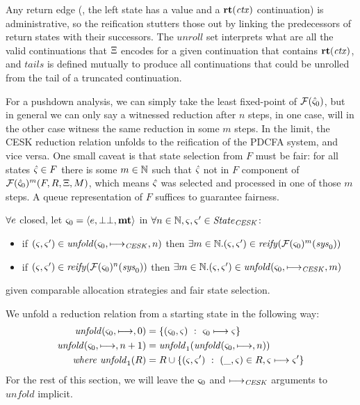 Any return edge (\ie, the left state has a value and a $\mathbf{rt}(\mathit{ctx})$ continuation) is administrative, so the reification stutters those out by linking the predecessors of return states with their successors.
%
The $\mathit{unroll}$ set interprets what are all the valid continuations that $\Xi$ encodes for a given continuation that contains $\mathbf{rt}(\mathit{ctx})$, and $\mathit{tails}$ is defined mutually to produce all continuations that could be unrolled from the tail of a truncated continuation.

For a pushdown analysis, we can simply take the least fixed-point of ${\mathcal F}(\hat\varsigma_0)$, but in general we can only say a witnessed reduction after $n$ steps, in one case, will in the other case witness the same reduction in some $m$ steps.
%
In the limit, the CESK reduction relation unfolds to the reification of the PDCFA system, and vice versa.
%
One small caveat is that state selection from $F$ must be fair: for all states $\hat\varsigma \in F$ there is some $m \in {\mathbb N}$ such that $\hat\varsigma$ not in $F$ component of ${\mathcal F}(\hat\varsigma_0)^m(F,R,\Xi,M)$, which means $\hat\varsigma$ was selected and processed in one of those $m$ steps.
%
A queue representation of $F$ suffices to guarantee fairness.

\begin{theorem}\label{thm:concrete-tabular}
  $\forall e$ closed, let $\varsigma_0 = \langle e,\bot\bot,\mathbf{mt} \rangle$ in
  $\forall n \in {\mathbb N},\varsigma,\varsigma' \in \mathit{State}_\mathit{CESK}$:
  \begin{itemize}
  \item{if $(\varsigma,\varsigma') \in \mathit{unfold}(\varsigma_0,\longmapsto_\mathit{CESK},n)$ then
      $\exists m \in {\mathbb N}. (\varsigma,\varsigma') \in \mathit{reify}({\mathcal F}(\varsigma_0)^m(\mathit{sys}_0))$}
  \item{
      if $(\varsigma,\varsigma') \in \mathit{reify}({\mathcal F}(\varsigma_0)^n(\mathit{sys}_0))$ then
      $\exists m \in {\mathbb N}. (\varsigma,\varsigma') \in \mathit{unfold}(\varsigma_0,\longmapsto_\mathit{CESK},m)$}
  \end{itemize}
  given comparable allocation strategies and fair state selection.
\end{theorem}

We unfold a reduction relation from a starting state in the following way:
\begin{align*}
  \mathit{unfold}(\varsigma_0, \longmapsto, 0) &= \{ (\varsigma_0,\varsigma)\ :\ \varsigma_0 \longmapsto \varsigma\} \\
  \mathit{unfold}(\varsigma_0, \longmapsto, n+1) &= \mathit{unfold}_1(\mathit{unfold}(\varsigma_0,\longmapsto,n)) \\
  \textit{where } \mathit{unfold}_1(R) &= R \cup \{ (\varsigma,\varsigma')\ :\ (\_,\varsigma) \in R, \varsigma \longmapsto \varsigma'\}
\end{align*}
For the rest of this section, we will leave the $\varsigma_0$ and $\longmapsto_\mathit{CESK}$ arguments to $\mathit{unfold}$ implicit.

